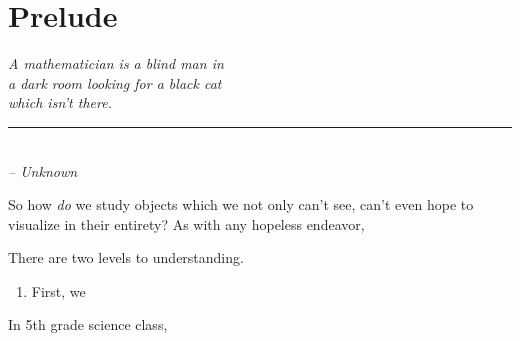 \chapter*{Prelude}

\begin{flushleft}
	\slshape{A mathematician is a blind man in }\\
	\slshape{a dark room looking for a black cat}\\
	\slshape{which isn’t there.}\\
	\rule[0pt]{15em}{0.5pt}\\
	\slshape{-- Unknown}
\end{flushleft}

\vspace{2em}

So how \emph{do} we study objects which we not only can't see, can't even hope to visualize in their entirety? As with any hopeless endeavor, 

There are two levels to understanding.
\begin{enumerate}
	\item First, we
\end{enumerate}

In 5th grade science class,
